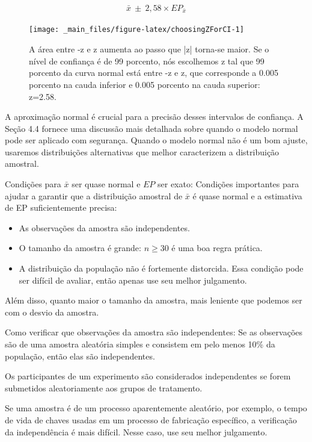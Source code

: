 \documentclass[
]{book}
\theoremstyle{definition}
\theoremstyle{definition}
\theoremstyle{definition}
\theoremstyle{definition}
\theoremstyle{remark}
\begin{document}
\begin{eqnarray}
\bar{x}\ \pm\ 2,58\times EP_{\bar{x}}
\label{eq:99PercCIForMean}
\end{eqnarray}

\begin{figure}

{\centering \texttt{[image: \_main\_files/figure-latex/choosingZForCI-1]} 

}

\caption{A área entre -z e z aumenta ao passo que |z| torna-se maior. Se o nível de confiança é de 99 porcento, nós escolhemos z tal que 99 porcento da curva normal está entre -z e z, que corresponde a 0.005 porcento na cauda inferior e 0.005 porcento na cauda superior: z=2.58.}\label{fig:choosingZForCI}
\end{figure}

A aproximação normal é crucial para a precisão desses intervalos de confiança. A Seção 4.4 fornece uma discussão mais detalhada sobre quando o modelo normal pode ser aplicado com segurança. Quando o modelo normal não é um bom ajuste, usaremos distribuições alternativas que melhor caracterizem a distribuição amostral.

Condições para \(\bar{x}\) ser quase normal e \(EP\) ser exato: Condições importantes para ajudar a garantir que a distribuição amostral de \(\bar{x}\) é quase normal e a estimativa de EP suficientemente precisa:

\begin{itemize}
\item
  As observações da amostra são independentes.
\item
  O tamanho da amostra é grande: \(n\geq30\) é uma boa regra prática.
\item
  A distribuição da população não é fortemente distorcida. Essa condição pode ser difícil de avaliar, então apenas use seu melhor julgamento.
\end{itemize}

Além disso, quanto maior o tamanho da amostra, mais leniente que podemos ser com o desvio da amostra.

Como verificar que observações da amostra são independentes: Se as observações são de uma amostra aleatória simples e consistem em pelo menos 10\% da população, então elas são independentes.

Os participantes de um experimento são considerados independentes se forem submetidos aleatoriamente aos grupos de tratamento.

Se uma amostra é de um processo aparentemente aleatório, por exemplo, o tempo de vida de chaves usadas em um processo de fabricação específico, a verificação da independência é mais difícil. Nesse caso, use seu melhor julgamento.
\end{document}
